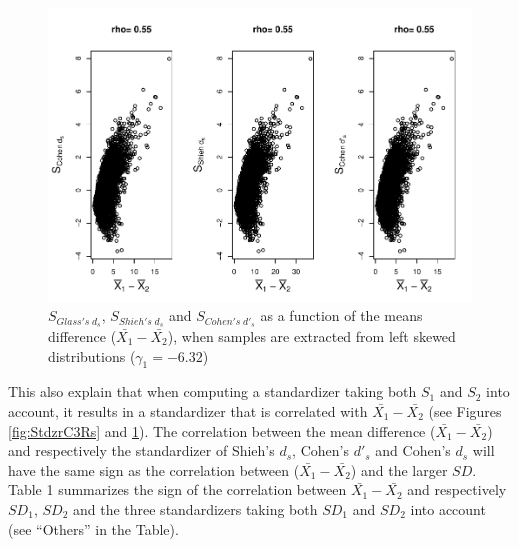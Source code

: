 \documentclass[
  man]{apa6}
\begin{document}
\begin{figure}
\centering
\includegraphics{Correlations-between-the-sample-means-difference-and-standardizers-of-all-estimators,-and-implications-on-biases-and-variances-of-all-estimators_files/figure-latex/StdzrC3Ls-1.pdf}
\caption{\label{fig:StdzrC3Ls}\(S_{Glass's \; d_s}\), \(S_{Shieh's \; d_s}\) and \(S_{Cohen's \; d'_s}\) as a function of the means difference (\(\bar{X_1}-\bar{X_2}\)), when samples are extracted from left skewed distributions (\(\gamma_1 = -6.32\))}
\end{figure}

This also explain that when computing a standardizer taking both \(S_1\) and \(S_2\) into account, it results in a standardizer that is correlated with \(\bar{X_1}-\bar{X_2}\) (see Figures \ref{fig:StdzrC3Rs} and \ref{fig:StdzrC3Ls}). The correlation between the mean difference (\(\bar{X_1}-\bar{X_2}\)) and respectively the standardizer of Shieh's \(d_s\), Cohen's \(d'_s\) and Cohen's \(d_s\) will have the same sign as the correlation between (\(\bar{X_1}-\bar{X_2}\)) and the larger \(SD\). Table 1 summarizes the sign of the correlation between \(\bar{X_1}-\bar{X_2}\) and respectively \(SD_1\), \(SD_2\) and the three standardizers taking both \(SD_1\) and \(SD_2\) into account (see \enquote{Others} in the Table).
\end{document}
